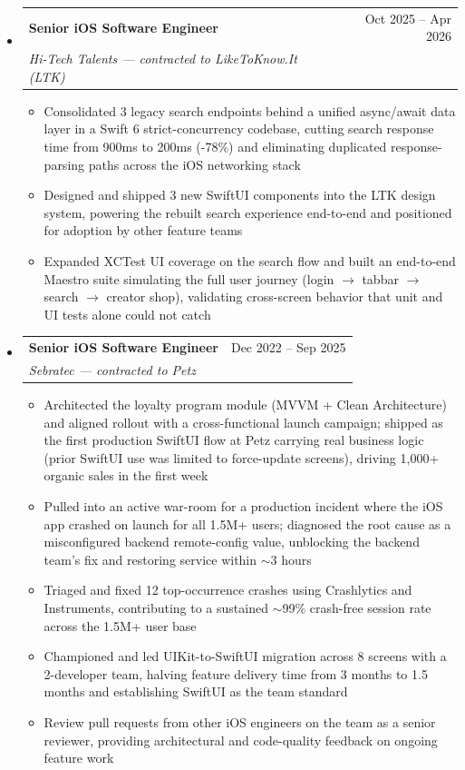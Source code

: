 \documentclass[11pt,letterpaper]{article}
\makeatletter
\newcommand{\resumeSubheading}[4]{
  \item
    \begin{tabular*}{\linewidth}{l@{\extracolsep{\fill}}r}
      \textbf{#1} & #2 \\
      \textit{#3} & \textit{#4} \\
    \end{tabular*}
}
\newcommand{\resumeItem}[1]{
  \item{#1}
}
\makeatother
\begin{document}
\begin{itemize}[leftmargin=0.15in]
    \resumeSubheading
        {Senior iOS Software Engineer}{Oct 2025 -- Apr 2026}
        {Hi-Tech Talents — contracted to LikeToKnow.It (LTK)}{}
        \begin{itemize}
            \resumeItem{Consolidated 3 legacy search endpoints behind a unified async/await data layer in a Swift 6 strict-concurrency codebase, cutting search response time from 900ms to 200ms (-78\%) and eliminating duplicated response-parsing paths across the iOS networking stack}
            \resumeItem{Designed and shipped 3 new SwiftUI components into the LTK design system, powering the rebuilt search experience end-to-end and positioned for adoption by other feature teams}
            \resumeItem{Expanded XCTest UI coverage on the search flow and built an end-to-end Maestro suite simulating the full user journey (login $\rightarrow$ tabbar $\rightarrow$ search $\rightarrow$ creator shop), validating cross-screen behavior that unit and UI tests alone could not catch}
        \end{itemize}

    \resumeSubheading
        {Senior iOS Software Engineer}{Dec 2022 -- Sep 2025}
        {Sebratec — contracted to Petz}{}
        \begin{itemize}
            \resumeItem{Architected the loyalty program module (MVVM + Clean Architecture) and aligned rollout with a cross-functional launch campaign; shipped as the first production SwiftUI flow at Petz carrying real business logic (prior SwiftUI use was limited to force-update screens), driving 1,000+ organic sales in the first week}
            \resumeItem{Pulled into an active war-room for a production incident where the iOS app crashed on launch for all 1.5M+ users; diagnosed the root cause as a misconfigured backend remote-config value, unblocking the backend team's fix and restoring service within $\sim$3 hours}
            \resumeItem{Triaged and fixed 12 top-occurrence crashes using Crashlytics and Instruments, contributing to a sustained $\sim$99\% crash-free session rate across the 1.5M+ user base}
            \resumeItem{Championed and led UIKit-to-SwiftUI migration across 8 screens with a 2-developer team, halving feature delivery time from 3 months to 1.5 months and establishing SwiftUI as the team standard}
            \resumeItem{Review pull requests from other iOS engineers on the team as a senior reviewer, providing architectural and code-quality feedback on ongoing feature work}
        \end{itemize}


\end{itemize}
\end{document}
